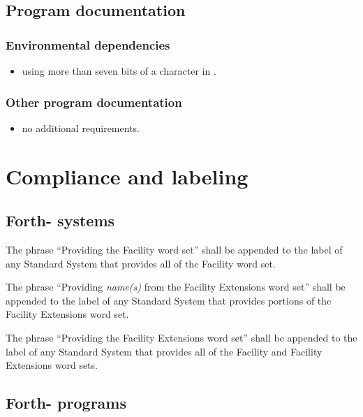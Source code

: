 \subsection{Program documentation} %

\subsubsection{Environmental dependencies} %

\begin{itemize}
\item using more than seven bits of a character in
	.
\end{itemize}

\subsubsection{Other program documentation} %

\begin{itemize}
\item no additional requirements.
\end{itemize}

\section{Compliance and labeling} %

\subsection{Forth-\snapshot{} systems} %

The phrase ``Providing the Facility word set'' shall be appended to
the label of any Standard System that provides all of the Facility
word set.

The phrase ``Providing \emph{name(s)} from the Facility Extensions
word set'' shall be appended to the label of any Standard System
that provides portions of the Facility Extensions word set.

The phrase ``Providing the Facility Extensions word set'' shall be
appended to the label of any Standard System that provides all of
the Facility and Facility Extensions word sets.

\subsection{Forth-\snapshot{} programs} %


